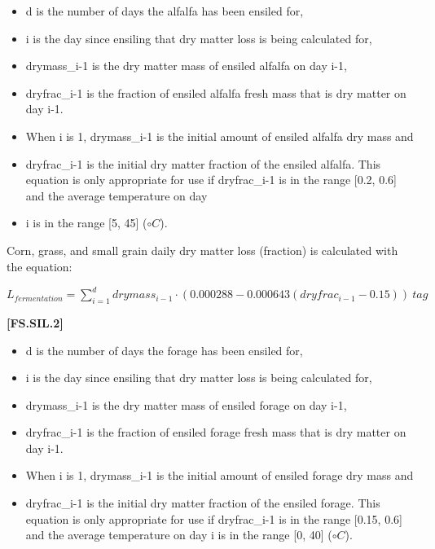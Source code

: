 \begin{refsection}
        \begin{itemize}
            \item d is the number of days the alfalfa has been ensiled for, 
            \item i is the day since ensiling that dry matter loss is being calculated for, 
            \item drymass\_{i-1} is the dry matter mass of ensiled alfalfa on day i-1,
            \item dryfrac\_{i-1} is the fraction of ensiled alfalfa fresh mass that is dry matter on day i-1. 
            \item When i is 1, drymass\_{i-1} is the initial amount of ensiled alfalfa dry mass and 
            \item dryfrac\_{i-1} is the initial dry matter fraction of the ensiled alfalfa. This equation is only appropriate for use if dryfrac\_{i-1} is in the range [0.2, 0.6] and the average temperature on day 
            \item i is in the range [5, 45] (\(\circ C\)).
        \end{itemize}
        \vspace{0.5cm}
        
Corn, grass, and small grain daily dry matter loss (fraction) is calculated with the equation:
\vspace{0.2cm}

        \begin{center}
        \(L_{fermentation} = \sum_{i=1}^{d} drymass_{i-1} \cdot (0.000288 - 0.000643(dryfrac_{i-1} - 0.15))\ tag\)
    \end{center}
        \vspace{0.5cm}
    
            {\raggedleft \textbf{[FS.SIL.2]}\par}
        \vspace{0.5cm}

        \begin{itemize}
            \item d is the number of days the forage has been ensiled for, 
            \item i is the day since ensiling that dry matter loss is being calculated for, 
            \item drymass\_{i-1} is the dry matter mass of ensiled forage on day i-1,
            \item dryfrac\_{i-1} is the fraction of ensiled forage fresh mass that is dry matter on day i-1. 
            \item When i is 1, drymass\_{i-1} is the initial amount of ensiled forage dry mass and 
            \item dryfrac\_{i-1} is the initial dry matter fraction of the ensiled forage. This equation is only appropriate for use if dryfrac\_{i-1} is in the range [0.15, 0.6] and the average temperature on day i is in the range [0, 40] (\(\circ C\)).
        \end{itemize}


\end{refsection}
